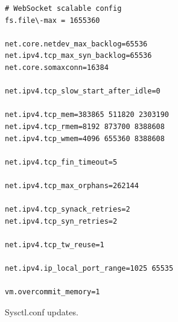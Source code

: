 \documentclass{uvamscse}
\begin{document}
\begin{sourcecode}[h]
\begin{lstlisting}[style=mono]
# WebSocket scalable config
fs.file\-max = 1655360

net.core.netdev_max_backlog=65536
net.ipv4.tcp_max_syn_backlog=65536
net.core.somaxconn=16384

net.ipv4.tcp_slow_start_after_idle=0

net.ipv4.tcp_mem=383865 511820 2303190
net.ipv4.tcp_rmem=8192 873700 8388608
net.ipv4.tcp_wmem=4096 655360 8388608

net.ipv4.tcp_fin_timeout=5

net.ipv4.tcp_max_orphans=262144

net.ipv4.tcp_synack_retries=2
net.ipv4.tcp_syn_retries=2

net.ipv4.tcp_tw_reuse=1

net.ipv4.ip_local_port_range=1025 65535

vm.overcommit_memory=1
\end{lstlisting}
\caption{Sysctl.conf updates.}
\label{lstlisting:sysctl}
\end{sourcecode}
\end{document}
